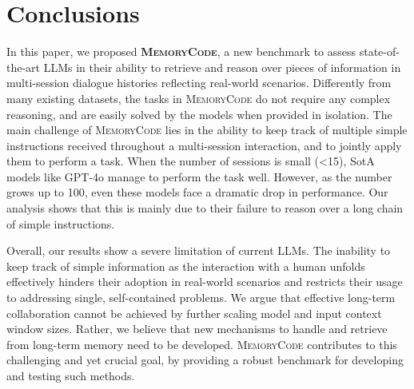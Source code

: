 \section{Conclusions}
\label{sec:discussion}

In this paper, we proposed \textbf{\textsc{MemoryCode}}, 
a new benchmark to assess state-of-the-art LLMs in their ability to retrieve and reason over pieces of information in multi-session dialogue histories reflecting real-world scenarios.
Differently from many existing datasets, the tasks in \textsc{MemoryCode} do not require any complex reasoning, and are easily solved by the models when provided in isolation. 
The main challenge of \textsc{MemoryCode} lies in the ability to keep track of multiple simple instructions received throughout a multi-session interaction, and to jointly apply them to perform a task.
When the number of sessions is small (<15), SotA models like GPT-4o manage to perform the task well. However, as the number grows up to 100, even these models face a dramatic drop in performance. 
Our analysis shows that this is mainly due to their failure to reason over a long chain of simple instructions. 

Overall, our results show a severe limitation of current LLMs. 
The inability to keep track of simple information as the interaction with a human unfolds effectively hinders their adoption in real-world scenarios and restricts their usage to addressing 
single, self-contained problems. 
We argue that effective long-term collaboration cannot be achieved by further scaling model and input context window sizes.
Rather, we believe that new mechanisms to handle and retrieve from long-term memory need to be developed. 
\textsc{MemoryCode} contributes to this challenging and yet crucial goal, by providing a robust benchmark for developing and testing such methods. 





